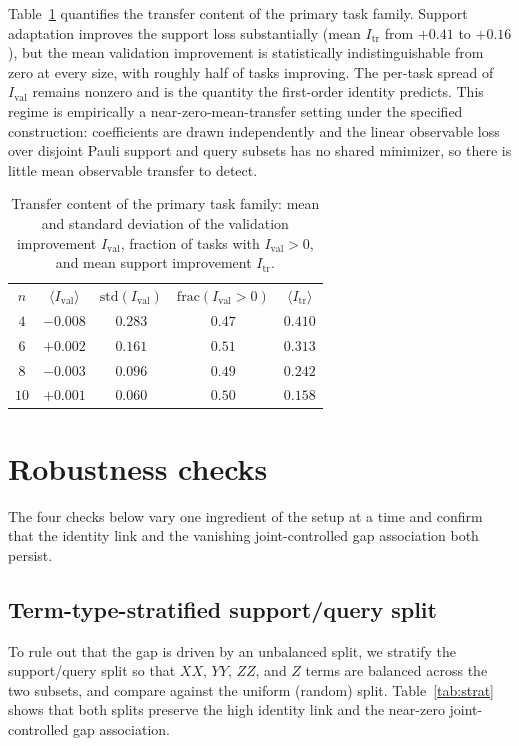 \documentclass[aps,pra,onecolumn,superscriptaddress,10pt]{revtex4-2}
\newcommand{\Itr}{I_{\mathrm{tr}}}
\newcommand{\Ival}{I_{\mathrm{val}}}
\begin{document}
Table~\ref{tab:transfer} quantifies the transfer content of the primary task family. Support
adaptation improves the support loss substantially (mean $\Itr$ from $+0.41$ to $+0.16$), but the
mean validation improvement is statistically indistinguishable from zero at every size, with roughly
half of tasks improving. The per-task spread of $\Ival$ remains nonzero and is the quantity the
first-order identity predicts. This regime is empirically a near-zero-mean-transfer setting under the specified construction:
coefficients are drawn independently and the linear observable loss over disjoint Pauli support and
query subsets has no shared minimizer, so there is little mean observable transfer to detect.

\begin{table}[h]
\caption{\label{tab:transfer}%
Transfer content of the primary task family: mean and standard deviation of the validation
improvement $\Ival$, fraction of tasks with $\Ival>0$, and mean support improvement $\Itr$.}
\begin{ruledtabular}
\begin{tabular}{ccccc}
$n$ & $\langle\Ival\rangle$ & $\mathrm{std}(\Ival)$ & $\mathrm{frac}(\Ival>0)$ & $\langle\Itr\rangle$ \\
\colrule
$4$  & $-0.008$ & $0.283$ & $0.47$ & $0.410$ \\
$6$  & $+0.002$ & $0.161$ & $0.51$ & $0.313$ \\
$8$  & $-0.003$ & $0.096$ & $0.49$ & $0.242$ \\
$10$ & $+0.001$ & $0.060$ & $0.50$ & $0.158$ \\
\end{tabular}
\end{ruledtabular}
\end{table}

\section{Robustness checks}
\label{sm:robust}

The four checks below vary one ingredient of the setup at a time and confirm that the identity link
and the vanishing joint-controlled gap association both persist.

\subsection{Term-type-stratified support/query split}

To rule out that the gap is driven by an unbalanced split, we stratify the support/query split
so that $XX$, $YY$, $ZZ$, and $Z$ terms are balanced across the two subsets, and compare against the
uniform (random) split. Table~\ref{tab:strat} shows that both splits preserve the high identity link
and the near-zero joint-controlled gap association.
\end{document}
